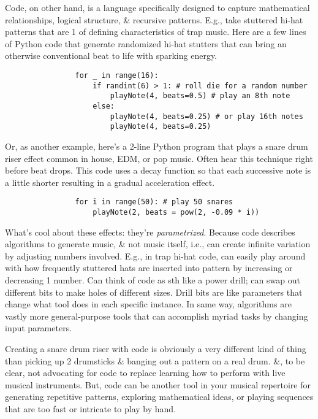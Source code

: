 \documentclass{article}
\begin{document}
\begin{itemize}
\begin{itemize}
\begin{itemize}
			Code, on other hand, is a language specifically designed to capture mathematical relationships, logical structure, \& recursive patterns. E.g., take stuttered hi-hat patterns that are 1 of defining characteristics of trap music. Here are a few lines of Python code that generate randomized hi-hat stutters that can bring an otherwise conventional beat to life with sparking energy.
			\begin{verbatim}
				for _ in range(16):
				    if randint(6) > 1: # roll die for a random number
				        playNote(4, beats=0.5) # play an 8th note
				    else:
				        playNote(4, beats=0.25) # or play 16th notes
				        playNote(4, beats=0.25)
			\end{verbatim}
			Or, as another example, here's a 2-line Python program that plays a snare drum riser effect common in house, EDM, or pop music. Often hear this technique right before beat drops. This code uses a decay function so that each successive note is a little shorter resulting in a gradual acceleration effect.
			\begin{verbatim}
				for i in range(50): # play 50 snares
				    playNote(2, beats = pow(2, -0.09 * i))
			\end{verbatim}
			What's cool about these effects: they're {\it parametrized}. Because code describes algorithms to generate music, \& not music itself, i.e., can create infinite variation by adjusting numbers involved. E.g., in trap hi-hat code, can easily play around with how frequently stuttered hats are inserted into pattern by increasing or decreasing 1 number. Can think of code as sth like a power drill; can swap out different bits to make holes of different sizes. Drill bits are like parameters that change what tool does in each specific instance. In same way, algorithms are vastly more general-purpose tools that can accomplish myriad tasks by changing input parameters.
			
			Creating a snare drum riser with code is obviously a very different kind of thing than picking up 2 drumsticks \& banging out a pattern on a real drum. \&, to be clear, not advocating for code to replace learning how to perform with live musical instruments. But, code can be another tool in your musical repertoire for generating repetitive patterns, exploring mathematical ideas, or playing sequences that are too fast or intricate to play by hand.
			

\end{itemize}
\end{itemize}
\end{itemize}
\end{document}
